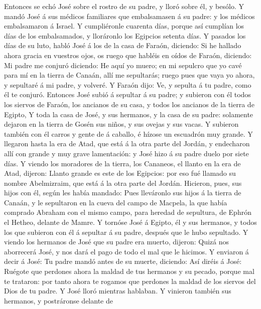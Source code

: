  Entonces se echó José sobre el rostro de su padre, y lloró
sobre él, y besólo.  Y mandó José á sus médicos familiares
que embalsamasen á su padre: y los médicos embalsamaron á Israel.
 Y cumpliéronle cuarenta días, porque así cumplían los días
de los embalsamados, y lloráronlo los Egipcios setenta días.
 Y pasados los días de su luto, habló José á los de la casa
de Faraón, diciendo: Si he hallado ahora gracia en vuestros ojos, os
ruego que habléis en oídos de Faraón, diciendo:  Mi padre me
conjuró diciendo: He aquí yo muero; en mi sepulcro que yo cavé para mí
en la tierra de Canaán, allí me sepultarás; ruego pues que vaya yo
ahora, y sepultaré á mi padre, y volveré.  Y Faraón dijo:
Ve, y sepulta á tu padre, como él te conjuró.  Entonces José
subió á sepultar á su padre; y subieron con él todos los siervos de
Faraón, los ancianos de su casa, y todos los ancianos de la tierra de
Egipto,  Y toda la casa de José, y sus hermanos, y la casa
de su padre: solamente dejaron en la tierra de Gosén sus niños, y sus
ovejas y sus vacas.  Y subieron también con él carros y
gente de á caballo, é hízose un escuadrón muy grande.  Y
llegaron hasta la era de Atad, que está á la otra parte del Jordán, y
endecharon allí con grande y muy grave lamentación: y José hizo á su
padre duelo por siete días.  Y viendo los moradores de la
tierra, los Cananeos, el llanto en la era de Atad, dijeron: Llanto
grande es este de los Egipcios: por eso fué llamado su nombre
Abelmizraim, que está á la otra parte del Jordán. 
Hicieron, pues, sus hijos con él, según les había mandado: 
Pues lleváronlo sus hijos á la tierra de Canaán, y le sepultaron en la
cueva del campo de Macpela, la que había comprado Abraham con el mismo
campo, para heredad de sepultura, de Ephrón el Hetheo, delante de Mamre.
 Y tornóse José á Egipto, él y sus hermanos, y todos los
que subieron con él á sepultar á su padre, después que le hubo
sepultado.  Y viendo los hermanos de José que su padre era
muerto, dijeron: Quizá nos aborrecerá José, y nos dará el pago de todo
el mal que le hicimos.  Y enviaron á decir á José: Tu padre
mandó antes de su muerte, diciendo:  Así diréis á José:
Ruégote que perdones ahora la maldad de tus hermanos y su pecado, porque
mal te trataron: por tanto ahora te rogamos que perdones la maldad de
los siervos del Dios de tu padre. Y José lloró mientras hablaban.
 Y vinieron también sus hermanos, y postráronse delante de
